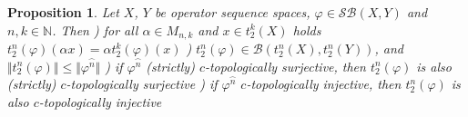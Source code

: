 \documentclass[12pt]{article}
\newtheorem{proposition}[theorem]{Proposition}
\begin{document}
\begin{proposition}\label{PrT2nOfOpIsWellDef}
Let $X$, $Y$ be operator sequence spaces, $\varphi\in\mathcal{SB}(X,Y)$ and $n,k\in\mathbb{N}$. Then 
) for all $\alpha\in M_{n,k}$ and $x\in t_2^k(X)$ holds $t_2^n(\varphi)(\alpha x)=\alpha t_2^k(\varphi)(x)$
) $t_2^n(\varphi)\in\mathcal{B}(t_2^n(X),t_2^n(Y))$, and $\Vert t_2^n(\varphi)\Vert\leq\Vert\varphi^{\wideparen{n}}\Vert$
) if $\varphi^{\wideparen{n}}$ (strictly) $c$-topologically surjective, then $t_2^n(\varphi)$ is also (strictly) $c$-topologically surjective
)  if $\varphi^{\wideparen{n}}$ $c$-topologically injective, then $t_2^n(\varphi)$ is also $c$-topologically injective
\end{proposition}
\end{document}
